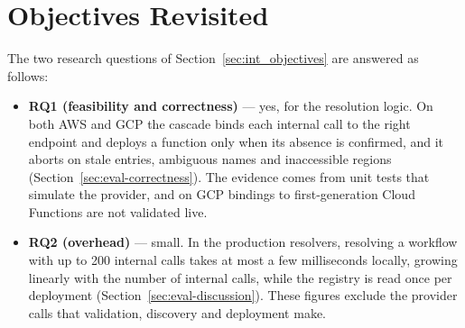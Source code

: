 \section{Objectives Revisited}
\label{sec:concl-objectives}

The two research questions of Section~\ref{sec:int_objectives} are answered as follows:
\begin{itemize}
  \item \textbf{RQ1 (feasibility and correctness)} --- yes, for the resolution logic. On both AWS
  and GCP the cascade binds each internal call to the right endpoint and deploys a function only
  when its absence is confirmed, and it aborts on stale entries, ambiguous names and inaccessible
  regions (Section~\ref{sec:eval-correctness}). The evidence comes from unit tests that simulate
  the provider, and on GCP bindings to first-generation Cloud Functions are not validated live.
  \item \textbf{RQ2 (overhead)} --- small. In the production resolvers, resolving a workflow with
  up to 200 internal calls takes at most a few milliseconds locally, growing linearly with the
  number of internal calls, while the registry is read once per deployment
  (Section~\ref{sec:eval-discussion}). These figures exclude the provider calls that validation,
  discovery and deployment make.
\end{itemize}

